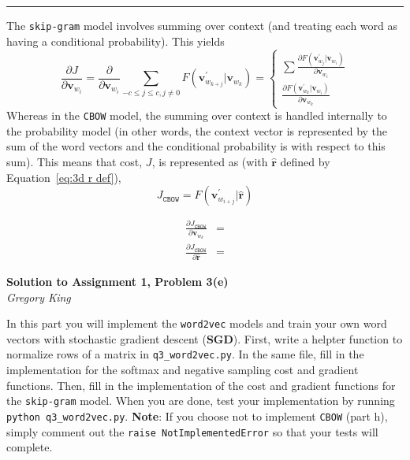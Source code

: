 \documentclass[letter,12pt]{article}
\newcommand{\myhwtitle}[3]
{\begin{center}
{\large {\bf Solution to Assignment {#1}, Problem {#2}}}\\
\medskip 
{\it {#3}} %
\end{center}}
\begin{document}
\noindent\rule{\textwidth}{0.4pt}\vspace{5mm}
The \texttt{skip-gram} model involves summing over context (and treating each word as having a conditional probability). This yields
\begin{equation*}
\frac{\partial{J}}{\partial{{\boldsymbol v}_{w_{i}}}} = \frac{\partial}{\partial{{\boldsymbol v}_{w_{i}}}} \sum_{-c\leq j\leq c, j\neq 0} F({\boldsymbol v}^{\prime}_{w_{k+j}}\vert{\boldsymbol v}_{w_{k}}) = 
\begin{cases}
 \sum\frac{\partial F({\boldsymbol v}^{\prime}_{w_{j}}\vert{\boldsymbol v}_{w_{i}})}{\partial{{\boldsymbol v}_{w_{i}}}}\\
 \frac{\partial F({\boldsymbol v}^{\prime}_{w_{k}}\vert{\boldsymbol v}_{w_{i}})}{\partial{{\boldsymbol v}_{w_{k}}}}
\end{cases}
\end{equation*}
Whereas in the \texttt{CBOW} model, the summing over context is handled internally to the probability model (in other words, the context vector is represented by the sum of the word vectors and the conditional probability is with respect to this sum). This means that cost, $J$, is represented as (with $\hat{\boldsymbol r}$ defined by Equation~\ref{eq:3d r def}),
\begin{equation}
J_{\texttt{CBOW}} =  F({\boldsymbol v}^{\prime}_{w_{i+j}}\vert\hat{\boldsymbol r})
\end{equation}

\begin{align}
\frac{\partial J_{\texttt{CBOW}}}{\partial{\boldsymbol v}_{w_{k}}} &= \\
\frac{\partial J_{\texttt{CBOW}}}{\partial\hat{\boldsymbol r}}         &=
\end{align}

\clearpage
\myhwtitle{1}{3(e)}{Gregory King}
\bigskip
\noindent In this part you will implement the \texttt{word2vec} models and train your own word vectors with stochastic gradient descent (\textbf{SGD}). First,
write a helpter function to normalize rows of a matrix in \texttt{q3\_word2vec.py}. In the same file, fill in the implementation for the softmax and negative sampling
cost and gradient functions. Then, fill in the implementation of the cost and gradient functions for the \texttt{skip-gram} model. When you are done, test your implementation
by running \texttt{python q3\_word2vec.py}. \textbf{Note}: If you choose not to implement \texttt{CBOW} (part h), simply comment out the \texttt{raise NotImplementedError}
so that your tests will complete.\vspace{5mm}
\end{document}
